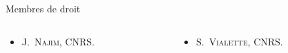 \documentclass[]{beamer}
\begin{document}
\begin{frame}
  \begin{block}{Membres de droit}
    \begin{columns}
      \begin{column}{0.5\textwidth}
        \begin{itemize}
          \item \textsc{J.~Najim}, CNRS.
        \end{itemize}
      \end{column}
      \begin{column}{0.5\textwidth}
        \begin{itemize}
          \item \textsc{S.~Vialette}, CNRS.
        \end{itemize}
      \end{column}
    \end{columns}
  \end{block}

\end{frame}

\end{document}
